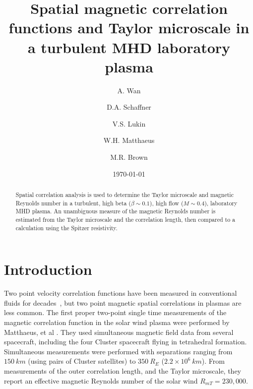 \documentclass[aps,prl,amsmath,amssymb,reprint,superscriptaddress]{revtex4-1} %
\begin{document}
\title{Spatial magnetic correlation functions and Taylor microscale in a turbulent MHD laboratory plasma}

\author{A. Wan}
\author{D.A. Schaffner}
\author{V.S. Lukin}
\author{W.H. Matthaeus}
\author{M.R. Brown}
\date{\today}
\begin{abstract}
Spatial correlation analysis is used to determine the Taylor microscale and magnetic Reynolds number in a turbulent, high beta ($\beta \sim 0.1$), high flow ($M \sim 0.4$), laboratory MHD plasma.  An unambiguous measure of the magnetic Reynolds number is estimated from the Taylor microscale and the correlation length, then compared to a calculation using the Spitzer resistivity.
\end{abstract}

\maketitle

\section{Introduction}

Two point velocity correlation functions have been measured in conventional fluids for decades~\cite{frisch95,Belmabrouk98}, but two point magnetic spatial correlations in plasmas are less common.  The first proper two-point single time measurements of the magnetic correlation function in the solar wind plasma were performed by Matthaeus, et al \cite{Matthaeus05}.  They used simultaneous magnetic field data from several spacecraft, including the four Cluster spacecraft flying in tetrahedral formation.  Simultaneous measurements were performed with separations ranging from $150~km$ (using pairs of Cluster satellites) to $350~R_E$ ($2.2 \times 10^6~km$).  From measurements of the outer correlation length, and the Taylor microscale, they report an effective magnetic Reynolds number of the solar wind $R_{mT}  = 230,000$.
\end{document}
